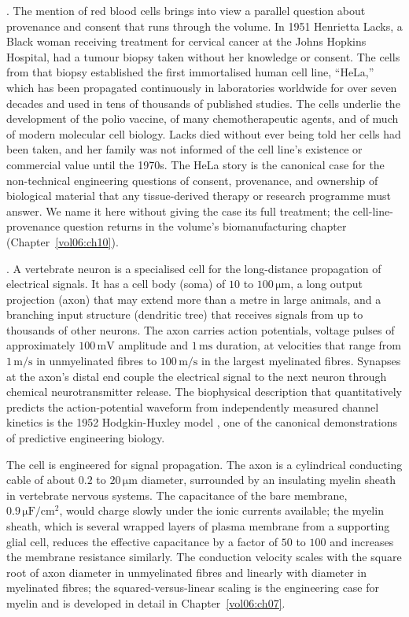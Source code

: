 . The mention
of red blood cells brings into view a parallel question about
provenance and consent that runs through the volume. In 1951
Henrietta Lacks, a Black woman receiving treatment for cervical
cancer at the Johns Hopkins Hospital, had a tumour biopsy taken
without her knowledge or consent. The cells from that biopsy
established the first immortalised human cell line, ``HeLa,'' which
has been propagated continuously in laboratories worldwide for over
seven decades and used in tens of thousands of published studies. The
cells underlie the development of the polio vaccine, of many
chemotherapeutic agents, and of much of modern molecular cell biology.
Lacks died without ever being told her cells had been taken, and her
family was not informed of the cell line's existence or commercial
value until the 1970s. The HeLa story is the canonical case for the
non-technical engineering questions of consent, provenance, and
ownership of biological material that any tissue-derived therapy or
research programme must answer. We name it here without giving the
case its full treatment; the cell-line-provenance question returns
in the volume's biomanufacturing chapter
(Chapter~\ref{vol06:ch10}).

. A vertebrate neuron is a
specialised cell for the long-distance propagation of electrical
signals. It has a cell body (soma) of $10$ to $100\,\si{\micro\meter}$,
a long output projection (axon) that may extend more than a metre in
large animals, and a branching input structure (dendritic tree) that
receives signals from up to thousands of other neurons. The axon
carries action potentials, voltage pulses of approximately
$100\,\text{mV}$ amplitude and $1\,\text{ms}$ duration, at velocities
that range from $1\,\text{m}/\text{s}$ in unmyelinated fibres to
$100\,\text{m}/\text{s}$ in the largest myelinated fibres. Synapses
at the axon's distal end couple the electrical signal to the next
neuron through chemical neurotransmitter release. The biophysical
description that quantitatively predicts the action-potential
waveform from independently measured channel kinetics is the 1952
Hodgkin-Huxley model \cite{paper:v6c01-hodgkin-huxley-1952}, one of
the canonical demonstrations of predictive engineering biology.

The cell is engineered for signal propagation. The axon is a
cylindrical conducting cable of about $0.2$ to $20\,\si{\micro\meter}$
diameter, surrounded by an insulating myelin sheath in vertebrate
nervous systems. The capacitance of the bare membrane,
$0.9\,\si{\micro\farad}/\text{cm}^2$, would charge slowly under the
ionic currents available; the myelin sheath, which is several wrapped
layers of plasma membrane from a supporting glial cell, reduces the
effective capacitance by a factor of $50$ to $100$ and increases the
membrane resistance similarly. The conduction velocity scales with
the square root of axon diameter in unmyelinated fibres and linearly
with diameter in myelinated fibres; the squared-versus-linear scaling
is the engineering case for myelin and is developed in detail in
Chapter~\ref{vol06:ch07}.

